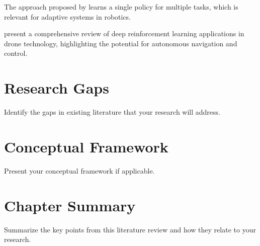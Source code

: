 The approach proposed by \cite{amendolaDroneLandingMoving2023} learns a single policy for multiple tasks, which is relevant for adaptive systems in robotics. 

\cite{azarDroneDeepReinforcement2021} present a comprehensive review of deep reinforcement learning applications in drone technology, highlighting the potential for autonomous navigation and control.


\section{Research Gaps}

Identify the gaps in existing literature that your research will address.

\section{Conceptual Framework}

Present your conceptual framework if applicable.

\section{Chapter Summary}

Summarize the key points from this literature review and how they relate to your research.
